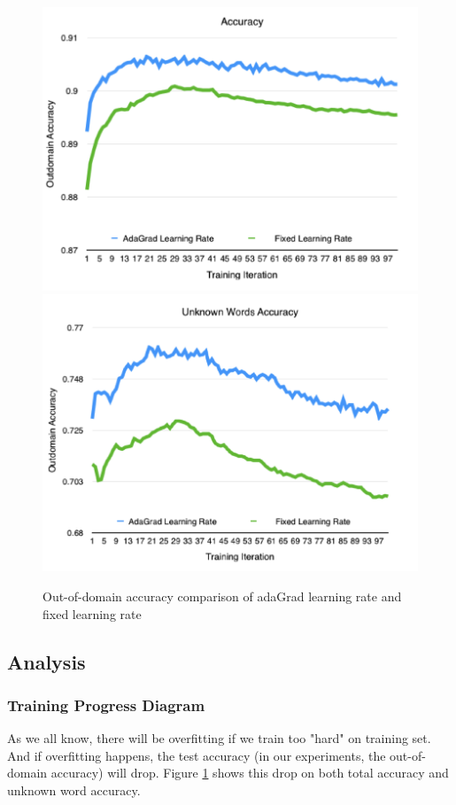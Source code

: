 \documentclass[11pt]{article}
\begin{document}
\begin{figure}
	\includegraphics[scale=0.5]{outdomain_adagrad.png}
	\includegraphics[scale=0.5]{outdomain_adagrad_unkown.png}
	\caption{Out-of-domain accuracy  comparison of adaGrad learning rate and fixed learning rate}\label{Adagrad_fig}
\end{figure}
\subsection{Analysis}

\subsubsection{Training Progress Diagram}
As we all know, there will be overfitting if we train too "hard" on training set. And if overfitting happens, the test accuracy (in our experiments, the out-of-domain accuracy) will drop. Figure \ref{Adagrad_fig} shows this drop on both total accuracy and unknown word accuracy.
\end{document}
